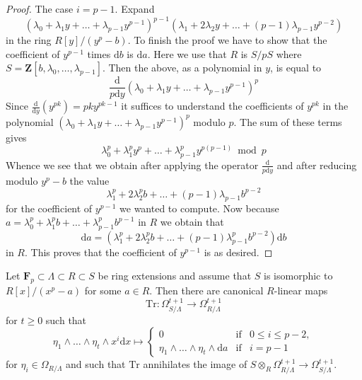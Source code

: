 \begin{proof}
\medskip\noindent
The case $i = p - 1$. Expand
$$
(\lambda_0 + \lambda_1 y + \ldots + \lambda_{p - 1}y^{p - 1})^{p - 1}
(\lambda_1 + 2 \lambda_2 y + \ldots + (p - 1)\lambda_{p - 1}y^{p - 2})
$$
in the ring $R[y]/(y^p - b)$. To finish the proof we have to show that
the coefficient of $y^{p - 1}$ times $\text{d}b$ is $\text{d}a$.
Here we use that $R$ is $S/pS$ where
$S = \mathbf{Z}[b, \lambda_0, \ldots, \lambda_{p - 1}]$.
Then the above, as a polynomial in $y$, is equal to
$$
\frac{\text{d}}{p\text{d}y}
(\lambda_0 + \lambda_1 y + \ldots + \lambda_{p - 1}y^{p - 1})^p
$$
Since $\frac{\text{d}}{\text{d}y}(y^{pk}) = pk y^{pk - 1}$
it suffices to understand the coefficients of $y^{pk}$ in the polynomial
$(\lambda_0 + \lambda_1 y + \ldots + \lambda_{p - 1}y^{p - 1})^p$
modulo $p$. The sum of these terms gives
$$
\lambda_0^p + \lambda_1^py^p + \ldots + \lambda_{p - 1}^py^{p(p - 1)}
\bmod p
$$
Whence we see that we obtain after applying the operator
$\frac{\text{d}}{p\text{d}y}$ and after reducing modulo $y^p - b$
the value
$$
\lambda_1^p + 2\lambda_2^pb + \ldots + (p - 1)\lambda_{p - 1}b^{p - 2}
$$
for the coefficient of $y^{p - 1}$ we wanted to compute. Now because
$a = \lambda_0^p + \lambda_1^p b + \ldots + \lambda_{p - 1}^pb^{p - 1}$
in $R$ we obtain that
$$
\text{d}a = (\lambda_1^p  + 2 \lambda_2^p b + \ldots +
(p - 1) \lambda_{p - 1}^p b^{p - 2}) \text{d}b
$$
in $R$. This proves that the coefficient of $y^{p - 1}$ is as desired.
\end{proof}

\begin{lemma}
\label{lemma-trace-higher}
Let $\mathbf{F}_p \subset \Lambda \subset R \subset S$ be ring extensions
and assume that $S$ is isomorphic to $R[x]/(x^p - a)$ for some $a \in R$.
Then there are canonical $R$-linear maps
$$
\text{Tr} :
\Omega^{t + 1}_{S/\Lambda}
\longrightarrow
\Omega_{R/\Lambda}^{t + 1}
$$
for $t \geq 0$ such that
$$
\eta_1 \wedge \ldots \wedge \eta_t \wedge x^i\text{d}x
\longmapsto
\left\{
\begin{matrix}
0 & \text{if} & 0 \leq i \leq p - 2, \\
\eta_1 \wedge \ldots \wedge \eta_t \wedge \text{d}a & \text{if} & i = p - 1
\end{matrix}
\right.
$$
for $\eta_i \in \Omega_{R/\Lambda}$ and such that $\text{Tr}$ annihilates the
image of
$S \otimes_R \Omega_{R/\Lambda}^{t + 1} \to \Omega_{S/\Lambda}^{t + 1}$.
\end{lemma}

